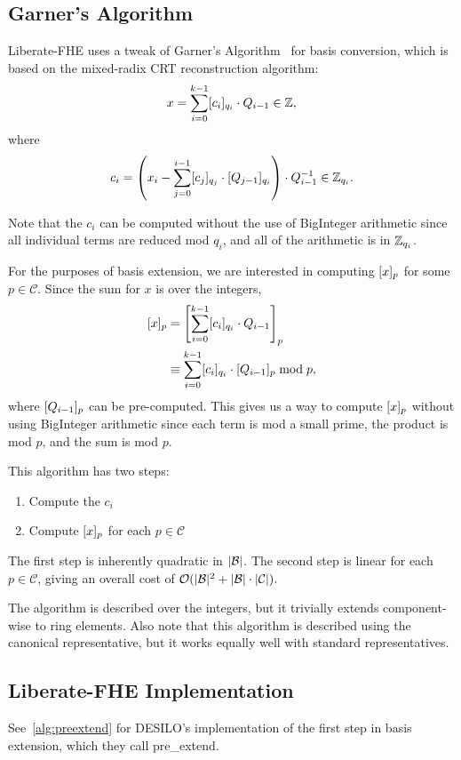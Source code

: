 \documentclass{article}
\begin{document}
\subsection{Garner's Algorithm}
Liberate-FHE uses a tweak of Garner's Algorithm~\cite[Section 5.6]{geddes1992algorithms} for basis conversion, which is based on the mixed-radix CRT reconstruction algorithm:
\[x=\sum_{i=0}^{k-1}\bracks{c_i}_{q_i}\cdot Q_{i-1}\in\Z,\]
where
\[c_i=\parens*{x_i-\sum_{j=0}^{i-1}\bracks{c_j}_{q_j}\cdot\bracks{Q_{j-1}}_{q_i}}\cdot Q_{i-1}^{-1}\in\Z_{q_i}.\]

Note that the $c_i$ can be computed without the use of BigInteger arithmetic since all individual terms are reduced mod $q_i$, and all of the arithmetic is in $\Z_{q_i}$.

For the purposes of basis extension, we are interested in computing $\bracks{x}_p$ for some $p\in\mathcal{C}$. Since the sum for $x$ is over the integers,
\begin{align}
\bracks{x}_p&=\bracks*{\sum_{i=0}^{k-1}\bracks{c_i}_{q_i}\cdot Q_{i-1}}_p\\
            &\equiv \sum_{i=0}^{k-1}\bracks{c_i}_{q_i}\cdot\bracks{Q_{i-1}}_p\bmod p,
\end{align}
where $\bracks{Q_{i-1}}_p$ can be pre-computed. This gives us a way to compute $\bracks{x}_p$ without using BigInteger arithmetic since each term is mod a small prime, the product is mod $p$, and the sum is mod $p$.

This algorithm has two steps:
\begin{enumerate}
    \item Compute the $c_i$
    \item Compute $\bracks{x}_p$ for each $p\in\mathcal{C}$
\end{enumerate}

The first step is inherently quadratic in $\abs{\mathcal{B}}$. The second step is linear for each $p\in\mathcal{C}$, giving an overall cost of $\mathcal{O}(\abs{\mathcal{B}}^2+\abs{\mathcal{B}}\cdot\abs{\mathcal{C}}).$

The algorithm is described over the integers, but it trivially extends component-wise to ring elements. Also note that this algorithm is described using the canonical representative, but it works equally well with standard representatives.

\subsection{Liberate-FHE Implementation}
See~\cref{alg:preextend} for DESILO's implementation of the first step in basis extension, which they call \textsf{pre\_extend}.
\end{document}
